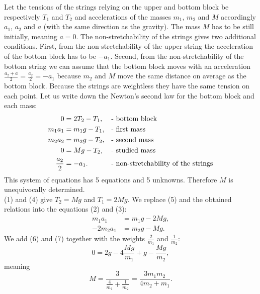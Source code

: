 \solueng
Let the tensions of the strings relying on the upper and bottom block be respectively $T_1$ and $T_2$ and accelerations of the masses $m_1$, $m_2$ and $M$ accordingly $a_1$, $a_2$ and $a$ (with the same direction as the gravity). The mass $M$ has to be still initially, meaning $a = 0$. The non-stretchability of the strings gives two additional conditions. First, from the non-stretchability of the upper string the acceleration of the bottom block has to be $-a_1$. Second, from the non-stretchability of the bottom string we can assume that the bottom block moves with an acceleration $\frac{a_2 + a}{2} = \frac{a_2}{2} = -a_1$ because $m_2$ and $M$ move the same distance on average as the bottom block. Because the strings are weightless they have the same tension on each point. Let us write down the Newton’s second law for the bottom block and each mass:
\begin{align}
0 &= 2T_2 - T_1,				& &\text{- bottom block}\label{Plokid:eq-1}\\
m_1a_1 &= m_1g - T_1,			& &\text{- first mass}\label{Plokid:eq-2}\\
m_2a_2 &= m_2g - T_2,			& &\text{- second mass}\label{Plokid:eq-3}\\
0 &= Mg - T_2,					& &\text{- studied mass}\label{Plokid:eq-4}\\
\frac{a_2}{2} &= -a_1.			& &\text{- non-stretchability of the strings\label{Plokid:eq-5}}
\end{align} 
This system of equations has 5 equations and 5 unknowns. Therefore $M$ is unequivocally determined.\\
(1) and (4) give $T_2 = Mg$ and $T_1 = 2Mg$. We replace (5) and the obtained relations into the equations (2) and (3):
\begin{align}
m_1a_1 &= m_1g - 2Mg, \label{Plokid:eq-6}\\
-2m_2a_1 &= m_2g - Mg. \label{Plokid:eq-7}
\end{align} 
We add (6) and (7) together with the weights $\frac{2}{m_1}$ and $\frac{1}{m_2}$:
\[
0 = 2g - 4\frac{Mg}{m_1} + g - \frac{Mg}{m_2},
\] 
meaning
\[
M = \frac{3}{\frac{4}{m_1} + \frac{1}{m_2}} = \frac{3m_1m_2}{4m_2 + m_1}.
\]
\probend